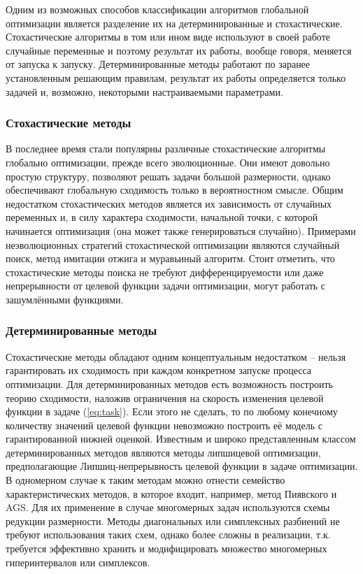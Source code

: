 Одним из возможных способов классификации алгоритмов глобальной оптимизации является разделение их
на детерминированные и стохастические. Стохастические алгоритмы в том или ином виде используют в своей работе
случайные переменные и поэтому результат их работы, вообще говоря, меняется от запуска к запуску. Детерминированные методы
работают по заранее установленным решающим правилам, результат их работы определяется только задачей и,
возможно, некоторыми настраиваемыми параметрами.

\subsubsection{Стохастические методы}

В последнее время стали популярны различные стохастические алгоритмы глобально оптимизации,
прежде всего эволюционные.
Они имеют довольно простую структуру, позволяют решать задачи большой размерности,
однако обеспечивают глобальную сходимость только в вероятностном смысле. Общим недостатком
стохастических методов является их зависимость от случайных переменных и, в силу характера сходимости,
начальной точки, с которой начинается оптимизация (она может также генерироваться случайно).
Примерами неэволюционных стратегий стохастической оптимизации являются случайный поиск,
метод имитации отжига и муравьиный алгоритм. Стоит отметить, что
стохастические методы поиска не требуют дифференцируемости или даже непрерывности от целевой функции задачи оптимизации,
могут работать с зашумлёнными функциями.

\subsubsection{Детерминированные методы}

Стохастические методы обладают одним концептуальным недостатком -- нельзя гарантировать их сходимость при
каждом конкретном запуске процесса оптимизации. Для детерминированных методов есть возможность построить теорию сходимости,
наложив ограничения на скорость изменения целевой функции в задаче (\ref{eq:task}). Если этого не сделать, то
по любому конечному количеству значений целевой функции невозможно построить её модель с гарантированной нижней оценкой.
Известным и широко представленным классом детерминированных методов являются методы липшицевой оптимизации, предполагающие
Липшиц-непрерывность целевой функции в задаче оптимизации. В одномерном случае к таким методам можно отнести семейство
характеристических методов, в которое входит, например, метод Пиявского и AGS.
Для их применение в случае многомерных задач используются схемы редукции размерности.
Методы диагональных или симплексных разбиений не требуют использования
таких схем, однако более сложны в реализации, т.к. требуется эффективно хранить и модифицировать множество многомерных гиперинтервалов
или симплексов.

